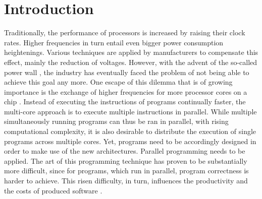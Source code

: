 \chapter{Introduction}
Traditionally, the performance of processors is increased by raising their clock rates. Higher frequencies in turn entail even bigger power consumption heightenings. Various techniques are applied by manufacturers to compensate this effect, mainly the reduction of voltages. However, with the advent of the so-called power wall \cite{LocalizingGlobalsAndStatics}, the industry has eventually faced the problem of not being able to achieve this goal any more. One escape of this dilemma that is of growing importance is the exchange of higher frequencies for more processor cores on a chip \cite{CPUScaling}. Instead of executing the instructions of programs continually faster, the multi-core approach is to execute multiple instructions in parallel. While multiple simultaneously running programs can thus be ran in parallel, with rising computational complexity, it is also desirable to distribute the execution of single programs across multiple cores. Yet, programs need to be accordingly designed in order to make use of the new architectures. Parallel programming needs to be applied. The art of this programming technique has proven to be substantially more difficult, since for programs, which run in parallel, program correctness is harder to achieve. This risen difficulty, in turn, influences the productivity and the costs of produced software \cite{ParallelProgrammerProductivity}.


